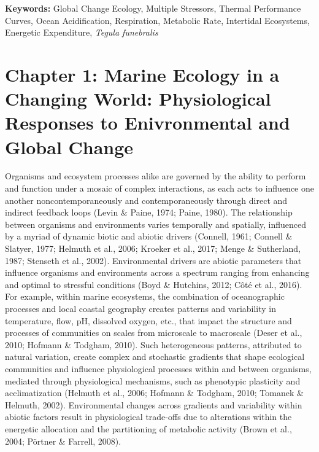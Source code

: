 \documentclass{CSUNthesis}
\begin{document}
\begin{spacing}{1.5}
\vspace{0.2em}

\noindent\textbf{Keywords:} Global Change Ecology, Multiple Stressors, Thermal Performance Curves, Ocean Acidification, Respiration, Metabolic Rate, Intertidal Ecosystems, Energetic Expenditure, \textit{Tegula funebralis}

\end{spacing}

\newpage

\mainmatter

\chapter*{Chapter 1: Marine Ecology in a Changing World: Physiological Responses to Enivronmental and Global Change}\label{chapter-1-marine-ecology-in-a-changing-world-physiological-responses-to-enivronmental-and-global-change}

Organisms and ecosystem processes alike are governed by the ability to perform and function under a mosaic of complex interactions, as each acts to influence one another noncontemporaneously and contemporaneously through direct and indirect feedback loops (Levin \& Paine, 1974; Paine, 1980). The relationship between organisms and environments varies temporally and spatially, influenced by a myriad of dynamic biotic and abiotic drivers (Connell, 1961; Connell \& Slatyer, 1977; Helmuth et al., 2006; Kroeker et al., 2017; Menge \& Sutherland, 1987; Stenseth et al., 2002). Environmental drivers are abiotic parameters that influence organisms and environments across a spectrum ranging from enhancing and optimal to stressful conditions (Boyd \& Hutchins, 2012; Côté et al., 2016). For example, within marine ecosystems, the combination of oceanographic processes and local coastal geography creates patterns and variability in temperature, flow, pH, dissolved oxygen, etc., that impact the structure and processes of communities on scales from microscale to macroscale (Deser et al., 2010; Hofmann \& Todgham, 2010). Such heterogeneous patterns, attributed to natural variation, create complex and stochastic gradients that shape ecological communities and influence physiological processes within and between organisms, mediated through physiological mechanisms, such as phenotypic plasticity and acclimatization (Helmuth et al., 2006; Hofmann \& Todgham, 2010; Tomanek \& Helmuth, 2002). Environmental changes across gradients and variability within abiotic factors result in physiological trade-offs due to alterations within the energetic allocation and the partitioning of metabolic activity (Brown et al., 2004; Pörtner \& Farrell, 2008).
\end{document}
